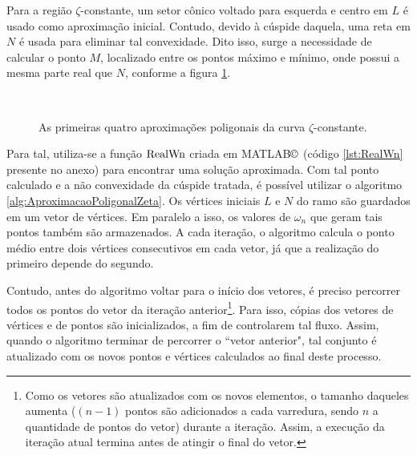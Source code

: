 Para a região $\zeta$-constante, um setor cônico voltado para esquerda e centro em $L$ é usado como aproximação inicial\cite{WISNIEWSKI2019}. Contudo, devido à cúspide daquela, uma reta em $N$ é usada para eliminar tal convexidade. Dito isso, surge a necessidade de calcular o ponto $M$, localizado entre os pontos máximo e mínimo, onde possui a mesma parte real que $N$, conforme a figura \ref{subfig:AproximacaoPoligonalZeta1}.

\begin{figure}[!ht]
\centering
\begin{subfigure}[t]{0.4\columnwidth}

\caption{}
\label{subfig:AproximacaoPoligonalZeta1}
\end{subfigure}
\begin{subfigure}[t]{0.4\columnwidth}

\caption{}
\label{subfig:AproximacaoPoligonalZeta2}
\end{subfigure}
\\
\begin{subfigure}[t]{0.4\columnwidth}

\caption{}
\label{subfig:AproximacaoPoligonalZeta3}
\end{subfigure}
\begin{subfigure}[t]{0.4\columnwidth}

\caption{}
\label{subfig:AproximacaoPoligonalZeta4}
\end{subfigure}
\caption{As primeiras quatro aproximações poligonais da curva $\zeta$-constante.}
\label{fig:AproximacoesPoligonalZeta}
\end{figure}

Para tal, utiliza-se a função $\operatorname{RealWn}$ criada em MATLAB$\copyright$\cite{MATLAB} (código \ref{lst:RealWn} presente no anexo) para encontrar uma solução aproximada. Com tal ponto calculado e a não convexidade da cúspide tratada, é possível utilizar o algoritmo \ref{alg:AproximacaoPoligonalZeta}. Os vértices iniciais $L$ e $N$ do ramo são guardados em um vetor de vértices. Em paralelo a isso, os valores de $\omega_n$ que geram tais pontos também são armazenados. A cada iteração, o algoritmo calcula o ponto médio entre dois vértices consecutivos em cada vetor, já que a realização do primeiro depende do segundo.

Contudo, antes do algoritmo voltar para o início dos vetores, é preciso percorrer todos os pontos do vetor da iteração anterior\footnote{Como os vetores são atualizados com os novos elementos, o tamanho daqueles aumenta ($(n-1)$ pontos são adicionados a cada varredura, sendo $n$ a quantidade de pontos do vetor) durante a iteração. Assim, a execução da iteração atual termina antes de atingir o final do vetor.}. Para isso, cópias dos vetores de vértices e de pontos são inicializados, a fim de controlarem tal fluxo. Assim, quando o algoritmo terminar de percorrer o ``vetor anterior", tal conjunto é atualizado com os novos pontos e vértices calculados ao final deste processo.

